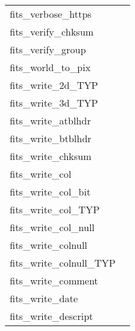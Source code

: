 \documentclass[11pt]{book}
\begin{document}
\begin{tabular}{lr}
fits\_verbose\_https  & \pageref{ffvhtps} \\
fits\_verify\_chksum  & \pageref{ffvcks} \\
fits\_verify\_group  & \pageref{ffgtvf} \\
fits\_world\_to\_pix & \pageref{ffxypx} \\
fits\_write\_2d\_TYP   & \pageref{ffp2dx} \\
fits\_write\_3d\_TYP   & \pageref{ffp3dx} \\
fits\_write\_atblhdr      & \pageref{ffphtb} \\
fits\_write\_btblhdr      & \pageref{ffphbn} \\
fits\_write\_chksum   & \pageref{ffpcks} \\
fits\_write\_col         & \pageref{ffpcl} \\
fits\_write\_col\_bit     & \pageref{ffpclx} \\
fits\_write\_col\_TYP     & \pageref{ffpcls} \\
fits\_write\_col\_null      & \pageref{ffpclu} \\
fits\_write\_colnull      & \pageref{ffpcn} \\
fits\_write\_colnull\_TYP & \pageref{ffpcnx} \\
fits\_write\_comment      & \pageref{ffpcom} \\
fits\_write\_date         & \pageref{ffpdat} \\
fits\_write\_descript  & \pageref{ffpdes} \\
\end{tabular}
\newpage
\end{document}
